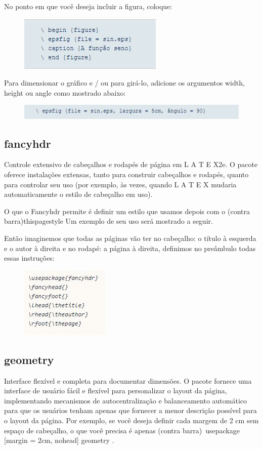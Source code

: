 \documentclass[12pt]{article}
\begin{document}
			No ponto em que você deseja incluir a figura, coloque:
			\begin{figure}[!htb]
				\centering
				\includegraphics[scale=1.1]{13.JPG}
			\end{figure}
			
			Para dimensionar o gráfico e / ou para girá-lo, adicione os argumentos width, height ou angle como mostrado abaixo:
			\begin{figure}[!htb]
				\centering
				\includegraphics[scale=1.1]{14.JPG}
			\end{figure}
		
		\subsection{fancyhdr}
			Controle extensivo de cabeçalhos e rodapés de página em L A T E X2e.
			O pacote oferece instalações extensas, tanto para construir cabeçalhos e rodapés, quanto para controlar seu uso (por exemplo, às vezes, quando L A T E X mudaria automaticamente o estilo de cabeçalho em uso).
			
			O que o Fancyhdr permite é definir um estilo que usamos depois com o (contra barra)thispagestyle
			Um exemplo de seu uso será mostrado a seguir.
			
			Então imaginemos que todas as páginas vão ter no cabeçalho: o título à esquerda e o autor à direita e no rodapé: a página à direita, definimos no preâmbulo todas essas instruções:
			\begin{figure}[!htb]
				\centering
				\includegraphics[scale=1.1]{15.JPG}
			\end{figure}
		
		\subsection{geometry}
			Interface flexível e completa para documentar dimensões.
			O pacote fornece uma interface de usuário fácil e flexível para personalizar o layout da página, implementando mecanismos de autocentralização e balanceamento automático para que os usuários tenham apenas que fornecer a menor descrição possível para o layout da página. Por exemplo, se você deseja definir cada margem de 2 cm sem espaço de cabeçalho, o que você precisa é apenas (contra barra)\ usepackage [margin = 2cm, nohead] {geometry} .
			
\end{document}
